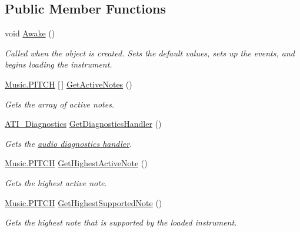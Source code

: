 \subsection*{Public Member Functions}
\begin{DoxyCompactItemize}
\item 
void \hyperlink{group___v_i_m_unity_gab92bac4e22476ffe39fc40f49fbd6ae5}{Awake} ()
\begin{DoxyCompactList}\small\item\em Called when the object is created. Sets the default values, sets up the events, and begins loading the instrument. \end{DoxyCompactList}\item 
\hyperlink{group___music_enums_ga508f69b199ea518f935486c990edac1d}{Music.\+P\+I\+T\+CH} \mbox{[}$\,$\mbox{]} \hyperlink{group___v_i_m_pub_func_ga119e0c582106fc9ecc2631e39d71d681}{Get\+Active\+Notes} ()
\begin{DoxyCompactList}\small\item\em Gets the array of active notes. \end{DoxyCompactList}\item 
\hyperlink{group___audio_testing_class_a_t_i___diagnostics}{A\+T\+I\+\_\+\+Diagnostics} \hyperlink{group___v_i_m_pub_func_ga7e60bc3c5464d8f34f0d56def675bcc6}{Get\+Diagnostics\+Handler} ()
\begin{DoxyCompactList}\small\item\em Gets the \hyperlink{group___audio_testing_class_a_t_i___diagnostics}{audio diagnostics handler}. \end{DoxyCompactList}\item 
\hyperlink{group___music_enums_ga508f69b199ea518f935486c990edac1d}{Music.\+P\+I\+T\+CH} \hyperlink{group___v_i_m_pub_func_gab58eabfbcdaa60a3a7dbd972df6f57a6}{Get\+Highest\+Active\+Note} ()
\begin{DoxyCompactList}\small\item\em Gets the highest active note. \end{DoxyCompactList}\item 
\hyperlink{group___music_enums_ga508f69b199ea518f935486c990edac1d}{Music.\+P\+I\+T\+CH} \hyperlink{group___v_i_m_pub_func_ga586d5ed5b0fe832d66c9a99aa160ceee}{Get\+Highest\+Supported\+Note} ()
\begin{DoxyCompactList}\small\item\em Gets the highest note that is supported by the loaded instrument. \end{DoxyCompactList}\item 

\end{DoxyCompactItemize}
